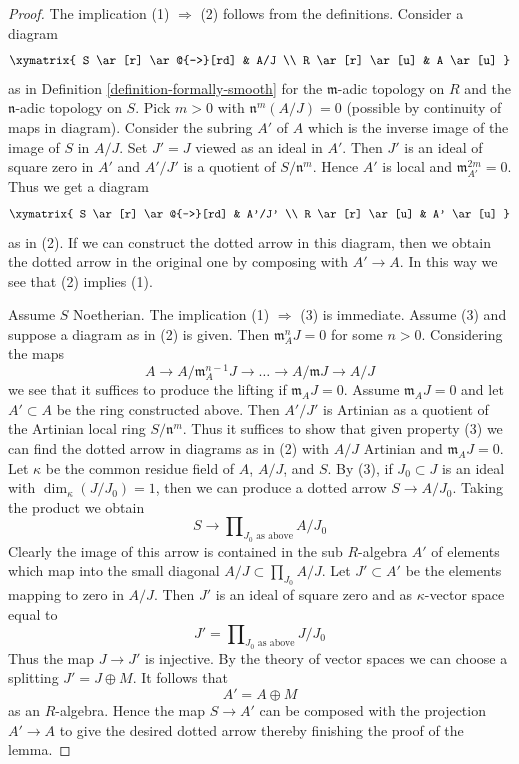 \begin{proof}
The implication (1) $\Rightarrow$ (2) follows from the definitions.
Consider a diagram
$$
\xymatrix{
S \ar[r] \ar@{-->}[rd] & A/J \\
R \ar[r] \ar[u] & A \ar[u]
}
$$
as in Definition \ref{definition-formally-smooth} for the
$\mathfrak m$-adic topology on $R$ and the $\mathfrak n$-adic topology on $S$.
Pick $m > 0$ with $\mathfrak n^m(A/J) = 0$
(possible by continuity of maps in diagram).
Consider the subring $A'$ of $A$ which is the inverse image
of the image of $S$ in $A/J$. Set $J' = J$ viewed as an ideal in $A'$.
Then $J'$ is an ideal of square zero in $A'$ and $A'/J'$
is a quotient of $S/\mathfrak n^m$. Hence $A'$ is local
and $\mathfrak m_{A'}^{2m} = 0$. Thus we get a diagram
$$
\xymatrix{
S \ar[r] \ar@{-->}[rd] & A'/J' \\
R \ar[r] \ar[u] & A' \ar[u]
}
$$
as in (2). If we can construct the dotted arrow in this diagram,
then we obtain the dotted arrow in the original one by composing
with $A' \to A$. In this way we see that (2) implies (1).

\medskip\noindent
Assume $S$ Noetherian. The implication (1) $\Rightarrow$ (3) is immediate.
Assume (3) and suppose a diagram as in (2) is given.
Then $\mathfrak m_A^n J = 0$ for some $n > 0$.
Considering the maps
$$
A \to A/\mathfrak m_A^{n - 1}J \to \ldots \to A/\mathfrak mJ \to A/J
$$
we see that it suffices to produce the lifting if $\mathfrak m_A J = 0$.
Assume $\mathfrak m_A J = 0$ and let $A' \subset A$ be the ring
constructed above. Then $A'/J'$ is Artinian
as a quotient of the Artinian local ring $S/\mathfrak n^m$.
Thus it suffices to show that given property (3) we can find the dotted
arrow in diagrams as in (2) with $A/J$ Artinian and
$\mathfrak m_A J = 0$.
Let $\kappa$ be the common residue field of $A$,
$A/J$, and $S$. By (3), if $J_0 \subset J$ is an ideal with
$\dim_\kappa(J/J_0) = 1$, then we can produce a dotted arrow
$S \to A/J_0$. Taking the product we obtain
$$
S \longrightarrow \prod\nolimits_{J_0 \text{ as above}} A/J_0
$$
Clearly the image of this arrow is contained in the sub $R$-algebra
$A'$ of elements which map into the small diagonal
$A/J \subset \prod_{J_0} A/J$.
Let $J' \subset A'$ be the elements mapping to zero in $A/J$.
Then $J'$ is an ideal of square zero and as $\kappa$-vector space
equal to
$$
J' = \prod\nolimits_{J_0 \text{ as above}} J/J_0
$$
Thus the map $J \to J'$ is injective. By the theory of vector spaces
we can choose a splitting $J' = J \oplus M$. It follows that
$$
A' = A \oplus M
$$
as an $R$-algebra. Hence the map $S \to A'$ can be composed with
the projection $A' \to A$ to give the desired dotted arrow thereby
finishing the proof of the lemma.
\end{proof}


